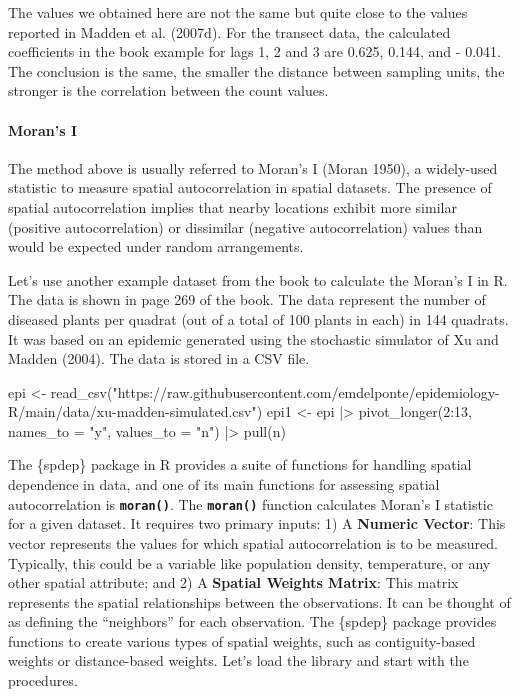 \documentclass[
  letterpaper,
]{book}
\let\oldparagraph\paragraph
\renewcommand{\paragraph}[1]{\oldparagraph{#1}\mbox{}}
\newenvironment{Shaded}{\begin{snugshade}}{\end{snugshade}}
\newcommand{\AttributeTok}[1]{\textcolor[rgb]{0.40,0.45,0.13}{#1}}
\newcommand{\DecValTok}[1]{\textcolor[rgb]{0.68,0.00,0.00}{#1}}
\newcommand{\FunctionTok}[1]{\textcolor[rgb]{0.28,0.35,0.67}{#1}}
\newcommand{\NormalTok}[1]{\textcolor[rgb]{0.00,0.23,0.31}{#1}}
\newcommand{\OtherTok}[1]{\textcolor[rgb]{0.00,0.23,0.31}{#1}}
\newcommand{\SpecialCharTok}[1]{\textcolor[rgb]{0.37,0.37,0.37}{#1}}
\newcommand{\StringTok}[1]{\textcolor[rgb]{0.13,0.47,0.30}{#1}}
\begin{document}
The values we obtained here are not the same but quite close to the
values reported in Madden et al. (2007d). For the transect data, the
calculated coefficients in the book example for lags 1, 2 and 3 are
0.625, 0.144, and - 0.041. The conclusion is the same, the smaller the
distance between sampling units, the stronger is the correlation between
the count values.

\hypertarget{morans-i}{%
\paragraph{Moran's I}\label{morans-i}}

The method above is usually referred to Moran's I (Moran 1950), a
widely-used statistic to measure spatial autocorrelation in spatial
datasets. The presence of spatial autocorrelation implies that nearby
locations exhibit more similar (positive autocorrelation) or dissimilar
(negative autocorrelation) values than would be expected under random
arrangements.

Let's use another example dataset from the book to calculate the Moran's
I in R. The data is shown in page 269 of the book. The data represent
the number of diseased plants per quadrat (out of a total of 100 plants
in each) in 144 quadrats. It was based on an epidemic generated using
the stochastic simulator of Xu and Madden (2004). The data is stored in
a CSV file.

\begin{Shaded}
\begin{Highlighting}[]
\NormalTok{epi }\OtherTok{\textless{}{-}} \FunctionTok{read\_csv}\NormalTok{(}\StringTok{"https://raw.githubusercontent.com/emdelponte/epidemiology{-}R/main/data/xu{-}madden{-}simulated.csv"}\NormalTok{)}
\NormalTok{epi1 }\OtherTok{\textless{}{-}}\NormalTok{ epi }\SpecialCharTok{|\textgreater{}}
  \FunctionTok{pivot\_longer}\NormalTok{(}\DecValTok{2}\SpecialCharTok{:}\DecValTok{13}\NormalTok{,}
               \AttributeTok{names\_to =} \StringTok{"y"}\NormalTok{,}
               \AttributeTok{values\_to =} \StringTok{"n"}\NormalTok{) }\SpecialCharTok{|\textgreater{}}
  \FunctionTok{pull}\NormalTok{(n)}
\end{Highlighting}
\end{Shaded}

The \{spdep\} package in R provides a suite of functions for handling
spatial dependence in data, and one of its main functions for assessing
spatial autocorrelation is \textbf{\texttt{moran()}}. The
\textbf{\texttt{moran()}} function calculates Moran's I statistic for a
given dataset. It requires two primary inputs: 1) A \textbf{Numeric
Vector}: This vector represents the values for which spatial
autocorrelation is to be measured. Typically, this could be a variable
like population density, temperature, or any other spatial attribute;
and 2) A \textbf{Spatial Weights Matrix}: This matrix represents the
spatial relationships between the observations. It can be thought of as
defining the ``neighbors'' for each observation. The \{spdep\} package
provides functions to create various types of spatial weights, such as
contiguity-based weights or distance-based weights. Let's load the
library and start with the procedures.\\
\end{document}
